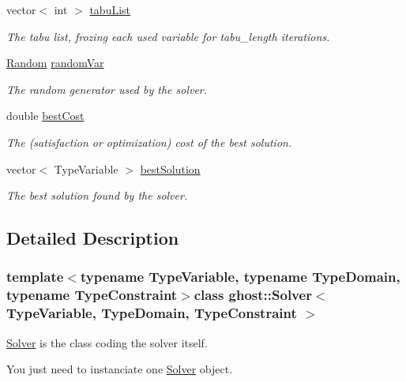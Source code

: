 \begin{DoxyCompactItemize}
vector$<$ int $>$ \hyperlink{classghost_1_1Solver_aa5c12894a6fbd524fb33906c8f3fbcae}{tabu\-List}
\begin{DoxyCompactList}\small\item\em The tabu list, frozing each used variable for tabu\-\_\-length iterations. \end{DoxyCompactList}\item 
\hyperlink{classghost_1_1Random}{Random} \hyperlink{classghost_1_1Solver_acec87a0a0adcc3a8d794a1ff84718201}{random\-Var}
\begin{DoxyCompactList}\small\item\em The random generator used by the solver. \end{DoxyCompactList}\item 
double \hyperlink{classghost_1_1Solver_a2fa5cf25d3417e3046aad3c1123320ed}{best\-Cost}
\begin{DoxyCompactList}\small\item\em The (satisfaction or optimization) cost of the best solution. \end{DoxyCompactList}\item 
vector$<$ Type\-Variable $>$ \hyperlink{classghost_1_1Solver_aa76ec90c418b23b261a0f3da63a9ee4a}{best\-Solution}
\begin{DoxyCompactList}\small\item\em The best solution found by the solver. \end{DoxyCompactList}\end{DoxyCompactItemize}


\subsection{Detailed Description}
\subsubsection*{template$<$typename Type\-Variable, typename Type\-Domain, typename Type\-Constraint$>$class ghost\-::\-Solver$<$ Type\-Variable, Type\-Domain, Type\-Constraint $>$}

\hyperlink{classghost_1_1Solver}{Solver} is the class coding the solver itself. 

You just need to instanciate one \hyperlink{classghost_1_1Solver}{Solver} object.

